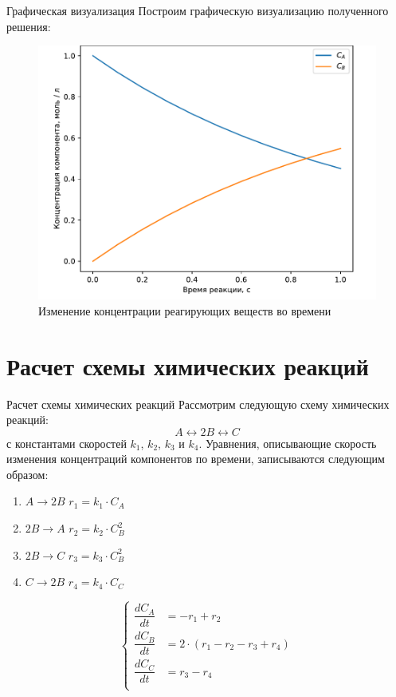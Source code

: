\documentclass[aspectratio=169, mathserif]{beamer}	%
\begin{document}
\begin{frame}[fragile, label=c]{Графическая визуализация}
\scriptsize
Построим графическую визуализацию полученного решения:
\vfill
\begin{figure}[h!]
	\centering
	\includegraphics[width=.6\linewidth]{./pics/figure_64}
	\caption{Изменение концентрации реагирующих веществ во времени}
	\label{fig:fig_64}
\end{figure}
\vfill
\end{frame}


\section{Расчет схемы химических реакций}
\begin{frame}[fragile, label=c]{Расчет схемы химических реакций}
\scriptsize
Рассмотрим следующую схему химических реакций:
\vfill
$$
	A \longleftrightarrow 2B \longleftrightarrow C
$$
\vfill
\noindent с константами скоростей $k_1$, $k_2$, $k_3$ и $k_4$.
Уравнения, описывающие скорость изменения концентраций компонентов по времени, записываются следующим образом:
\vfill
\begin{minipage}{.49\textwidth}
\begin{enumerate}
\item $A \longrightarrow 2B$ \qquad $r_1 = k_1 \cdot C_A$
\item $2B \longrightarrow A$ \qquad $r_2 = k_2 \cdot C_B ^2$
\item $2B \longrightarrow C$ \qquad $r_3 = k_3 \cdot C_B ^2$
\item $C \longrightarrow 2B$ \qquad $r_4 = k_4 \cdot C_C$
\end{enumerate}
\end{minipage}
\begin{minipage}{.5\textwidth}
\begin{equation*}
	\left\{
	\begin{aligned}
		\dfrac{dC_A}{dt} &= -r_1 + r_2 \\
		\dfrac{dC_B}{dt} &=  2 \cdot \left(r_1 - r_2 - r_3 + r_4\right) \\
		\dfrac{dC_C}{dt} &=  r_3 - r_4 \\
	\end{aligned}
	\right.
\end{equation*}
\end{minipage}
\vfill
\end{frame}
\end{document}
